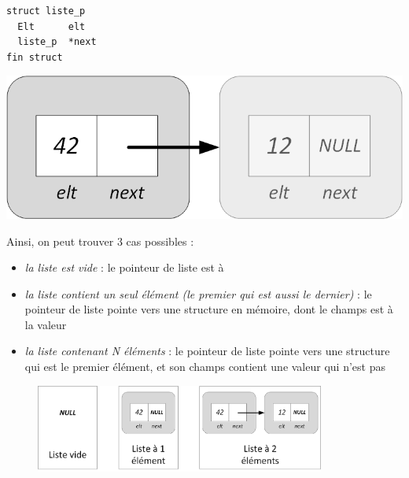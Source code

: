\documentclass[11pt,a4paper]{article}
\begin{document}
\begin{table}[!ht]
  \centering
  \begin{minipage}{0.4\textwidth}
    \centering
\begin{lstlisting}[style=algorithmique]
struct liste_p
  Elt      elt
  liste_p  *next
fin struct \end{lstlisting}
  \end{minipage}
  \hfillx
  \begin{minipage}{0.55\textwidth}
    \centering
\includegraphics[scale=0.75]{img/listes/Listes_Pointeurs_1_Structure_Detaillee.png}
  \end{minipage}
\end{table}

Ainsi, on peut trouver 3 cas possibles :
\begin{itemize}
\item \textit{la liste est vide} : le pointeur de liste est à 
\item \textit{la liste contient un seul élément (le premier qui est aussi le dernier)} : le pointeur de liste pointe vers une structure en mémoire, dont le champs  est à la valeur 
\item \textit{la liste contenant N éléments} : le pointeur de liste pointe vers une structure qui est le premier élément, et son champs  contient une valeur qui n'est pas 
\end{itemize}

\medskip

\begin{figure}[ht!]
\centering
\centerline{   %
\includegraphics[width=0.85\textwidth]{img/listes/Listes_Pointeurs_2_exemple1_espace.png}
}
\end{figure}
\end{document}
